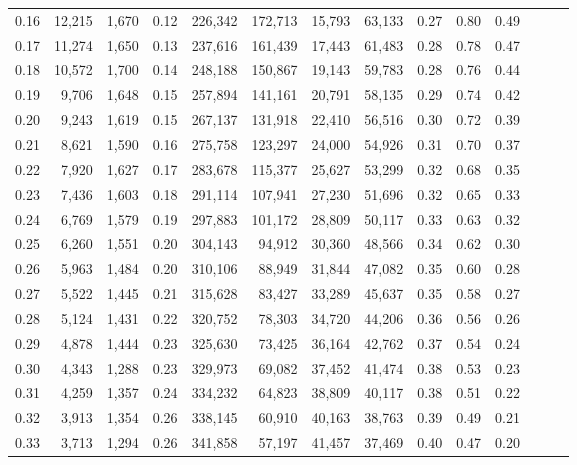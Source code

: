 \begin{tabular}{rrrrrrrrrrrrrr}
0.16 &  12,215 &  1,670 &  0.12 &  226,342 &  172,713 &  15,793 &  63,133 &  0.27 &  0.80 &      0.49 \\
0.17 &  11,274 &  1,650 &  0.13 &  237,616 &  161,439 &  17,443 &  61,483 &  0.28 &  0.78 &      0.47 \\
0.18 &  10,572 &  1,700 &  0.14 &  248,188 &  150,867 &  19,143 &  59,783 &  0.28 &  0.76 &      0.44 \\
0.19 &   9,706 &  1,648 &  0.15 &  257,894 &  141,161 &  20,791 &  58,135 &  0.29 &  0.74 &      0.42 \\
0.20 &   9,243 &  1,619 &  0.15 &  267,137 &  131,918 &  22,410 &  56,516 &  0.30 &  0.72 &      0.39 \\
0.21 &   8,621 &  1,590 &  0.16 &  275,758 &  123,297 &  24,000 &  54,926 &  0.31 &  0.70 &      0.37 \\
0.22 &   7,920 &  1,627 &  0.17 &  283,678 &  115,377 &  25,627 &  53,299 &  0.32 &  0.68 &      0.35 \\
0.23 &   7,436 &  1,603 &  0.18 &  291,114 &  107,941 &  27,230 &  51,696 &  0.32 &  0.65 &      0.33 \\
0.24 &   6,769 &  1,579 &  0.19 &  297,883 &  101,172 &  28,809 &  50,117 &  0.33 &  0.63 &      0.32 \\
0.25 &   6,260 &  1,551 &  0.20 &  304,143 &   94,912 &  30,360 &  48,566 &  0.34 &  0.62 &      0.30 \\
0.26 &   5,963 &  1,484 &  0.20 &  310,106 &   88,949 &  31,844 &  47,082 &  0.35 &  0.60 &      0.28 \\
0.27 &   5,522 &  1,445 &  0.21 &  315,628 &   83,427 &  33,289 &  45,637 &  0.35 &  0.58 &      0.27 \\
0.28 &   5,124 &  1,431 &  0.22 &  320,752 &   78,303 &  34,720 &  44,206 &  0.36 &  0.56 &      0.26 \\
0.29 &   4,878 &  1,444 &  0.23 &  325,630 &   73,425 &  36,164 &  42,762 &  0.37 &  0.54 &      0.24 \\
0.30 &   4,343 &  1,288 &  0.23 &  329,973 &   69,082 &  37,452 &  41,474 &  0.38 &  0.53 &      0.23 \\
0.31 &   4,259 &  1,357 &  0.24 &  334,232 &   64,823 &  38,809 &  40,117 &  0.38 &  0.51 &      0.22 \\
0.32 &   3,913 &  1,354 &  0.26 &  338,145 &   60,910 &  40,163 &  38,763 &  0.39 &  0.49 &      0.21 \\
0.33 &   3,713 &  1,294 &  0.26 &  341,858 &   57,197 &  41,457 &  37,469 &  0.40 &  0.47 &      0.20 \\

\end{tabular}
